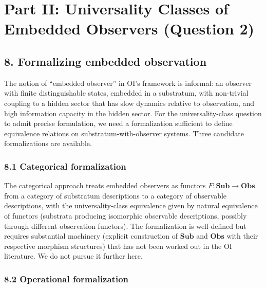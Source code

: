 \documentclass[
]{article}
\begin{document}
\hypertarget{part-ii-universality-classes-of-embedded-observers-question-2}{%
\section{Part II: Universality Classes of Embedded Observers (Question
2)}\label{part-ii-universality-classes-of-embedded-observers-question-2}}

\hypertarget{formalizing-embedded-observation}{%
\subsection{8. Formalizing embedded
observation}\label{formalizing-embedded-observation}}

The notion of ``embedded observer'' in OI's framework is informal: an
observer with finite distinguishable states, embedded in a substratum,
with non-trivial coupling to a hidden sector that has slow dynamics
relative to observation, and high information capacity in the hidden
sector. For the universality-class question to admit precise
formulation, we need a formalization sufficient to define equivalence
relations on substratum-with-observer systems. Three candidate
formalizations are available.

\hypertarget{categorical-formalization}{%
\subsubsection{8.1 Categorical
formalization}\label{categorical-formalization}}

The categorical approach treats embedded observers as functors
\(F: \mathbf{Sub} \to \mathbf{Obs}\) from a category of substratum
descriptions to a category of observable descriptions, with the
universality-class equivalence given by natural equivalence of functors
(substrata producing isomorphic observable descriptions, possibly
through different observation functors). The formalization is
well-defined but requires substantial machinery (explicit construction
of \(\mathbf{Sub}\) and \(\mathbf{Obs}\) with their respective morphism
structures) that has not been worked out in the OI literature. We do not
pursue it further here.

\hypertarget{operational-formalization}{%
\subsubsection{8.2 Operational
formalization}\label{operational-formalization}}
\end{document}
